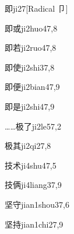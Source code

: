 \begin{verbete}{即}{ji2}{7}[Radical 卩]
\end{verbete}

\begin{verbete}{即或}{ji2huo4}{7,8}
\end{verbete}

\begin{verbete}{即若}{ji2ruo4}{7,8}
\end{verbete}

\begin{verbete}{即使}{ji2shi3}{7,8}
\end{verbete}

\begin{verbete}{即便}{ji2bian4}{7,9}
\end{verbete}

\begin{verbete}{即是}{ji2shi4}{7,9}
\end{verbete}

\begin{verbete}{……极了}{ji2le5}{7,2}
\end{verbete}

\begin{verbete}{极其}{ji2qi2}{7,8}
\end{verbete}

\begin{verbete}{技术}{ji4shu4}{7,5}
\end{verbete}

\begin{verbete}{技俩}{ji4liang3}{7,9}
\end{verbete}

\begin{verbete}{坚守}{jian1shou3}{7,6}
\end{verbete}

\begin{verbete}{坚持}{jian1chi2}{7,9}
\end{verbete}

